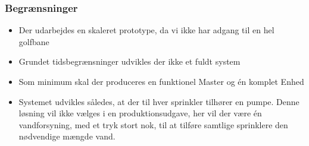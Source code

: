 \subsubsection*{Begrænsninger}
\begin{itemize}
\item Der udarbejdes en skaleret prototype, da vi ikke har adgang til en hel golfbane
\item Grundet tidsbegrænsninger udvikles der ikke et fuldt system 
\item Som minimum skal der produceres en funktionel Master og én komplet Enhed
\item Systemet udvikles således, at der til hver sprinkler tilhører en pumpe. Denne løsning vil ikke vælges i en produktionsudgave, her vil der være én vandforsyning, med et tryk stort nok, til at tilføre samtlige sprinklere den nødvendige mængde vand.
\end{itemize}



